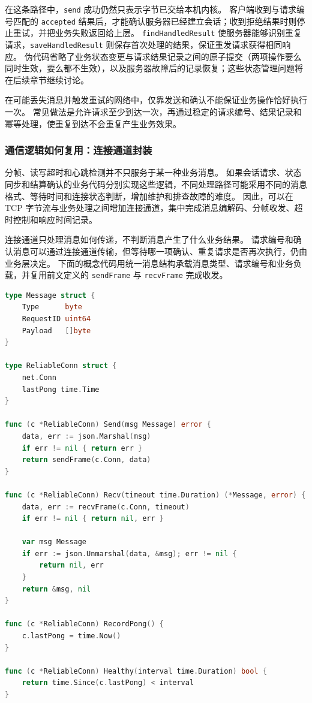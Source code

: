 在这条路径中，\texttt{send} 成功仍然只表示字节已交给本机内核。
客户端收到与请求编号匹配的 \texttt{accepted} 结果后，才能确认服务器已经建立会话；收到拒绝结果时则停止重试，并把业务失败返回给上层。
\texttt{findHandledResult} 使服务器能够识别重复请求，\texttt{saveHandledResult} 则保存首次处理的结果，保证重发请求获得相同响应。
伪代码省略了业务状态变更与请求结果记录之间的原子提交（两项操作要么同时生效，要么都不生效），以及服务器故障后的记录恢复；这些状态管理问题将在后续章节继续讨论。

在可能丢失消息并触发重试的网络中，仅靠发送和确认不能保证业务操作恰好执行一次。
常见做法是允许请求至少到达一次，再通过稳定的请求编号、结果记录和幂等处理，使重复到达不会重复产生业务效果。

\subsubsection{通信逻辑如何复用：连接通道封装}\label{sec2:reliable-conn}

分帧、读写超时和心跳检测并不只服务于某一种业务消息。
如果会话请求、状态同步和结算确认的业务代码分别实现这些逻辑，不同处理路径可能采用不同的消息格式、等待时间和连接状态判断，增加维护和排查故障的难度。
因此，可以在 TCP 字节流与业务处理之间增加连接通道，集中完成消息编解码、分帧收发、超时控制和响应时间记录。

连接通道只处理消息如何传递，不判断消息产生了什么业务结果。
请求编号和确认消息可以通过连接通道传输，但等待哪一项确认、重复请求是否再次执行，仍由业务层决定。
下面的概念代码用统一消息结构承载消息类型、请求编号和业务负载，并复用前文定义的 \texttt{sendFrame} 与 \texttt{recvFrame} 完成收发。

\begin{tcolorbox}[title=连接通道封装（概念示例）]
\begin{lstlisting}[style=codeblock, language=go]
type Message struct {
    Type      byte
    RequestID uint64
    Payload   []byte
}

type ReliableConn struct {
    net.Conn
    lastPong time.Time
}

func (c *ReliableConn) Send(msg Message) error {
    data, err := json.Marshal(msg)
    if err != nil { return err }
    return sendFrame(c.Conn, data)
}

func (c *ReliableConn) Recv(timeout time.Duration) (*Message, error) {
    data, err := recvFrame(c.Conn, timeout)
    if err != nil { return nil, err }

    var msg Message
    if err := json.Unmarshal(data, &msg); err != nil {
        return nil, err
    }
    return &msg, nil
}

func (c *ReliableConn) RecordPong() {
    c.lastPong = time.Now()
}

func (c *ReliableConn) Healthy(interval time.Duration) bool {
    return time.Since(c.lastPong) < interval
}
\end{lstlisting}
\end{tcolorbox}

